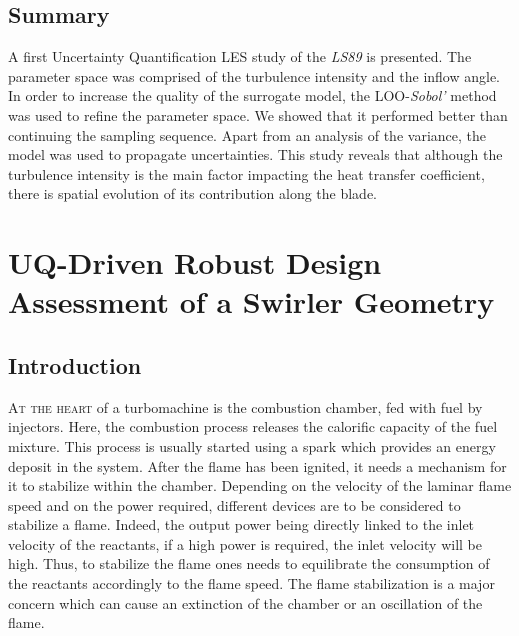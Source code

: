 \section{Summary}\label{sec:ls89_ccl}

A first Uncertainty Quantification LES study of the \textit{LS89} is presented. The parameter space was comprised of the turbulence intensity and the inflow angle. In order to increase the quality of the surrogate model, the LOO-\textit{Sobol'} method was used to refine the parameter space. We showed that it performed better than continuing the sampling sequence. Apart from an analysis of the variance, the model was used to propagate uncertainties. This study reveals that although the turbulence intensity is the main factor impacting the heat transfer coefficient, there is spatial evolution of its contribution along the blade.


\chapter{UQ-Driven Robust Design Assessment of a Swirler Geometry}\label{chap:swirler}

\newcommand{\pdv}[2]{\frac{\partial{#1}}{\partial{#2}}}
\newcommand{\tilda}[1]{\tilde{#1}}

\section{Introduction}\label{sec:intro}

\lettrine{A}{t the heart} of a turbomachine is the combustion chamber, fed with fuel by injectors. Here, the combustion process releases the calorific capacity of the fuel mixture. This process is usually started using a spark which provides an energy deposit in the system. After the flame has been ignited, it needs a mechanism for it to stabilize within the chamber. Depending on the velocity of the laminar flame speed and on the power required, different devices are to be considered to stabilize a flame. Indeed, the output power being directly linked to the inlet velocity of the reactants, if a high power is required, the inlet velocity will be high. Thus, to stabilize the flame ones needs to equilibrate the consumption of the reactants accordingly to the flame speed. The flame stabilization is a major concern which can cause an extinction of the chamber or an oscillation of the flame.

